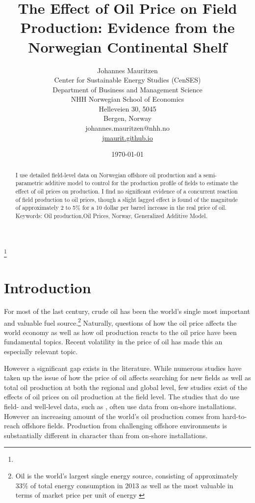 \documentclass[11pt]{article}
\title{The Effect of Oil Price on Field Production: Evidence from the Norwegian Continental Shelf}
\author{Johannes Mauritzen\\
		Center for Sustainable Energy Studies (CenSES)\\
		Department of Business and Management Science\\
        NHH Norwegian School of Economics\\
        Helleveien 30, 5045\\
        Bergen, Norway\\
        johannes.mauritzen@nhh.no\\
        \url{jmaurit.github.io}\\
		}
\date{\today}
\begin{document}
 \begin{spacing}{1} %
	\maketitle

\begin{abstract}
I use detailed field-level data on Norwegian offshore oil production and a semi-parametric additive model to control for the production profile of fields to estimate the effect of oil prices on production.  I find no significant evidence of a concurrent reaction of field production to oil prices, though a slight lagged effect is found of the magnitude of approximately 2 to 5\% for a 10 dollar per barrel increase in the real price of oil.\\
Keywords: Oil production,Oil Prices, Norway, Generalized Additive Model.
\end{abstract}

\thanks{}
 \end{spacing}

\section{Introduction}

For most of the last century, crude oil has been the world's single most important and valuable fuel source.\footnote{Oil is the world's largest single energy source, consisting of approximately 33\% of total energy consumption in 2013 as well as the most valuable in terms of market price per unit of energy \citep{british_petroleum_statistical_2013}} Naturally, questions of how the oil price affects the world economy as well as how oil production reacts to the oil price have been fundamental topics. Recent volatility in the price of oil has made this an especially relevant topic. 

However a significant gap exists in the literature.  While numerous studies have taken up the issue of how the price of oil affects searching for new fields as well as total oil production at both the regional and global level, few studies exist of the effects of oil prices on oil production at the field level.  The studies that do use field- and well-level data, such as \citet{rao_taxation_2010}, often use data from on-shore installations.  However an increasing amount of the world's oil production comes from hard-to-reach offshore fields.  Production from challenging offshore environments is substantially different in character than from on-shore installations.
\end{document}
